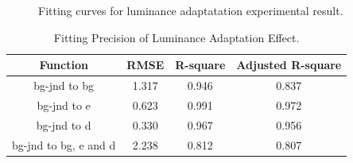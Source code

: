 \documentclass[journal]{IEEEtran}
\begin{document}
\begin{figure}[!t]
	\caption{Fitting curves for luminance adaptatation experimental result.}
	\label{fig:curve_fitting_bg}
\end{figure}
\begin{table}[htbp]
	\centering
	\caption{Fitting Precision of Luminance Adaptation Effect.}
	\begin{tabular}{|c|c|c|c|}
		\hline
		Function & RMSE & R-square & Adjusted R-square \\
		\hline
		bg-jnd to bg & 1.317 & 0.946 & 0.837 \\
		\hline
		bg-jnd to e & 0.623 & 0.991 & 0.972 \\
		\hline
		bg-jnd to d & 0.330 & 0.967 & 0.956 \\
		\hline
		bg-jnd to bg, e and d & 2.238 & 0.812 & 0.807 \\
		\hline
	\end{tabular}%
	\label{tab:fit_precition_bg}%
\end{table}%
\end{document}
